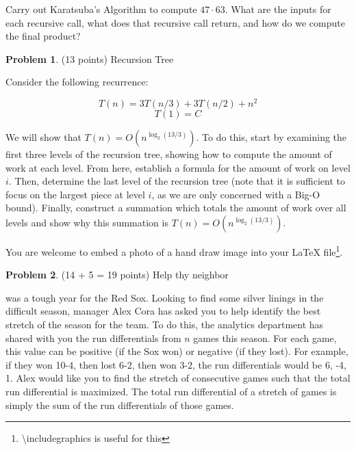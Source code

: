 \documentclass[11pt]{article}
\theoremstyle{definition}
\theoremstyle{theorem}
\newtheorem{prob}{Problem}
\newcommand{\solution}[1]{\medskip\noindent{\color{DarkBlue}\textbf{Solution:}} #1}
\newcommand{\solution}[1]{}
\begin{document}
\noindent Carry out Karatsuba's Algorithm to compute $47 \cdot 63$.  What are the inputs for each recursive call, what does that recursive call return, and how do we compute the final product?

\solution



\newpage
\begin{prob} (13 points) Recursion Tree \end{prob}

\noindent Consider the following recurrence:

$$T(n) = 3T(n/3) + 3T(n/2) + n^2$$
$$T(1) = C$$

We will show that $T(n) = O(n^{\log_2 (13/3)})$. To do this, start by examining the first three levels of the recursion tree, showing how to compute the amount of work at each level. From here, establish a formula for the amount of work on level $i$. Then, determine the last level of the recursion tree (note that it is sufficient to focus on the largest piece at level $i$, as we are only concerned with a Big-O bound). Finally, construct a summation which totals the amount of work over all levels and show why this summation is $T(n) = O(n^{\log_2 (13/3)})$.

You are welcome to embed a photo of a hand draw image into your LaTeX file\footnote{\textbackslash includegraphics is useful for this}.\\

\solution

\newpage

\begin{prob}
  \label{prob:sox}
(14 + 5 = 19 points)  Help thy neighbor
\end{prob}

 was a tough year for the Red Sox. Looking to find some silver linings in the difficult season, manager Alex Cora has asked you to help identify the best stretch of the season for the team. To do this, the analytics department has shared with you the run differentials from $n$ games this season. For each game, this value can be positive (if the Sox won) or negative (if they lost). For example, if they won 10-4, then lost 6-2, then won 3-2, the run differentials would be 6, -4, 1. Alex would like you to find the stretch of consecutive games such that the total run differential is maximized. The total run differential of a stretch of games is simply the sum of the run differentials of those games. 
\end{document}
